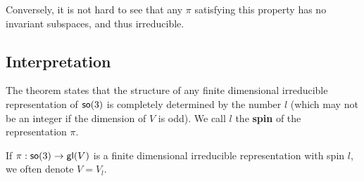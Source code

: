 Conversely, it is not hard to see that any $\pi$ satisfying this property has no invariant subspaces, and thus irreducible.

\subsection{Interpretation}
The theorem states that the structure of any finite dimensional irreducible representation of $\operatorname{\textsf{so}}(3)$ is completely determined by the number $l$ (which may not be an integer if the dimension of $V$ is odd). We call $l$ the \textbf{spin} of the representation $\pi$. 

If $\pi: \operatorname{\textsf{so}}(3) \rightarrow \operatorname{\textsf{gl}}(V)$ is a finite dimensional irreducible representation with spin $l$, we often denote $V = V_l$.


